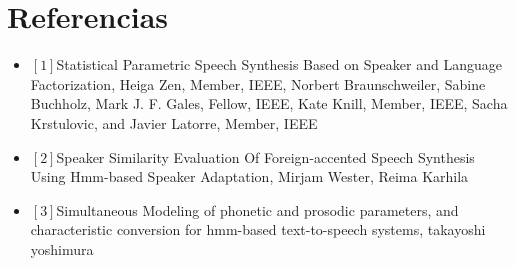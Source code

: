 \section{Referencias}
\begin{itemize}
\item $[1]$Statistical Parametric Speech Synthesis Based on Speaker and Language Factorization, Heiga Zen, Member, IEEE, Norbert Braunschweiler, Sabine Buchholz, Mark J. F. Gales, Fellow, IEEE, Kate Knill, Member, IEEE, Sacha Krstulovic, and Javier Latorre, Member, IEEE
\item $[2]$Speaker Similarity Evaluation Of Foreign-accented Speech Synthesis Using Hmm-based Speaker Adaptation, Mirjam Wester, Reima Karhila
\item $[3]$Simultaneous Modeling of phonetic and prosodic parameters, and characteristic conversion for hmm-based text-to-speech systems, takayoshi yoshimura
\end{itemize}